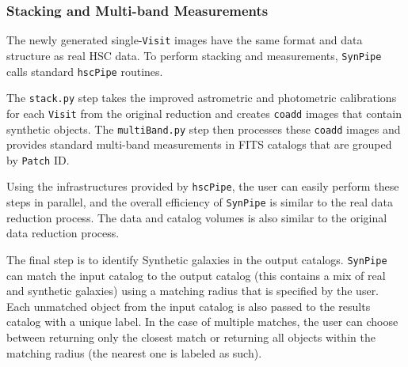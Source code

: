 \documentclass[useamsfonts]{pasj01}
\def\hscpipe{\texttt{hscPipe}}
\def\synpipe{\texttt{SynPipe}}
\def\coadd{\texttt{coadd}}
\def\visit{\texttt{Visit}}
\begin{document}

\subsubsection{Stacking and Multi-band Measurements}
    \label{sssec:multiband}

    The newly generated single-\visit{} images have the same format and data
    structure as real HSC data. To perform stacking and measurements, \synpipe{} calls 
    standard \hscpipe{} routines.
    
    The \texttt{stack.py} step takes the improved astrometric and photometric
    calibrations for each \visit{} from the original reduction and creates
    \coadd{}  images that contain synthetic objects.
    The \texttt{multiBand.py} step then processes these \coadd{}  images and
    provides standard multi-band measurements in FITS catalogs that are grouped by
    \texttt{Patch} ID.

    Using the infrastructures provided by \hscpipe{}, the user can easily perform these 
    steps in parallel, and the overall efficiency of \synpipe{} is similar to
    the real data reduction process. 
    The data and catalog volumes is also similar to the original data reduction process.

    The final step is to identify Synthetic galaxies in the output catalogs. 
    \synpipe{} can match the input catalog to the output catalog (this contains a mix 
    of real and synthetic galaxies) using a matching radius that is specified by the 
    user.
    Each unmatched object from the input catalog is also passed to the results catalog
    with a unique label.
    In the case of multiple matches, the user can choose between returning only the
    closest match or returning all objects within the matching radius (the nearest one
    is labeled as such).
\end{document}
